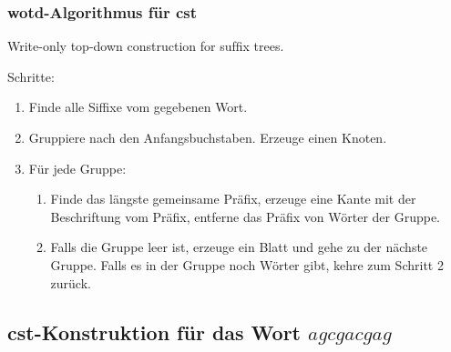 \documentclass{beamer}
\begin{document}
\begin{frame}[t]
\frametitle{wotd-Algorithmus für cst}

    Write-only top-down construction for sufﬁx trees.\\

    \medskip

    Schritte:
    \begin{enumerate}
    \item Finde alle Siffixe vom gegebenen Wort.
    \item Gruppiere nach den Anfangsbuchstaben. Erzeuge einen Knoten.
    \item Für jede Gruppe:
    \begin{enumerate}
    \item Finde das längste gemeinsame Präfix, erzeuge eine Kante mit der Beschriftung vom Präfix, entferne das Präfix von Wörter der Gruppe.
    \item Falls die Gruppe leer ist, erzeuge ein Blatt und gehe zu der nächste Gruppe. Falls es in der Gruppe noch Wörter gibt, kehre zum Schritt 2 zurück.
    \end{enumerate}
    \end{enumerate}
\end{frame}


\subsection{cst-Konstruktion für das Wort $agcgacgag$}

\end{document}
